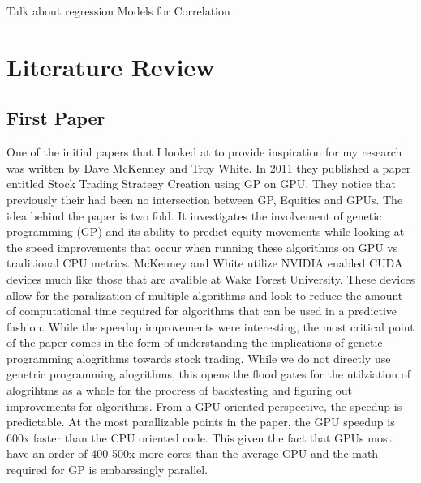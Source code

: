 \documentclass[paper=letter, fontsize=11pt]{scrartcl}
\numberwithin{equation}{section}		%
\numberwithin{figure}{section}			%
\numberwithin{table}{section}				%
\begin{document}
\begin{spacing}{2}
Talk about regression Models for Correlation

\section{Literature Review}

\subsection{First Paper}

One of the initial papers that I looked at to provide inspiration for my research was written by Dave McKenney and Troy White. In 2011 they published a paper entitled Stock Trading Strategy Creation using GP on GPU. They notice that previously their had been no intersection between GP, Equities and GPUs. The idea behind the paper is two fold. It investigates the involvement of genetic programming (GP) and its ability to predict equity movements while looking at the speed improvements that occur when running these algorithms on GPU vs traditional CPU metrics. McKenney and White utilize NVIDIA enabled CUDA devices much like those that are avalible at Wake Forest University. These devices allow for the paralization of multiple algorithms and look to reduce the amount of computational time required for algorithms that can be used in a predictive fashion. While the speedup improvements were interesting, the most critical point of the paper comes in the form of understanding the implications of genetic programming alogrithms towards stock trading. While we do not directly use genetric programming alogrithms, this opens the flood gates for the utilziation of alogrihtms as a whole for the procress of backtesting and figuring out improvements for algorithms. From a GPU oriented perspective, the speedup is predictable. At the most parallizable points in the paper, the GPU speedup is 600x faster than the CPU oriented code. This given the fact that GPUs most have an order of 400-500x more cores than the average CPU and the math required for GP is embarssingly parallel. \cite{STS}


\end{spacing}
\end{document}
